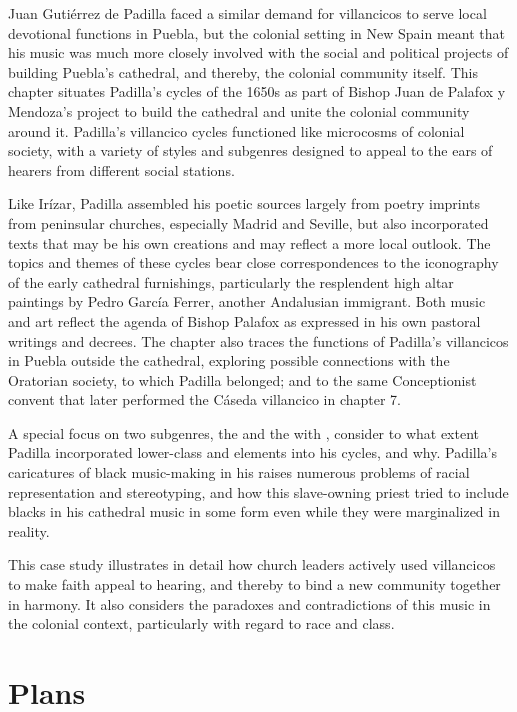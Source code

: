 \documentclass{vcbook-proposal}
\begin{document}
Juan Gutiérrez de Padilla faced a similar demand for villancicos to serve local devotional functions in Puebla, but the colonial setting in New Spain meant that his music was much more closely involved with the social and political projects of building Puebla's cathedral, and thereby, the colonial community itself.
This chapter situates Padilla's cycles of the 1650s as part of Bishop Juan de Palafox y Mendoza's project to build the cathedral and unite the colonial community around it.
Padilla's villancico cycles functioned like microcosms of colonial society, with a variety of styles and subgenres designed to appeal to the ears of hearers from different social stations.

Like Irízar, Padilla assembled his poetic sources largely from poetry imprints from peninsular churches, especially Madrid and Seville, but also incorporated texts that may be his own creations and may reflect a more local outlook.
The topics and themes of these cycles bear close correspondences to the iconography of the early cathedral furnishings, particularly the resplendent high altar paintings by Pedro García Ferrer, another Andalusian immigrant.
Both  music and art reflect the agenda of Bishop Palafox as expressed in his own pastoral writings and decrees.
The chapter also traces the functions of Padilla's villancicos in Puebla outside the cathedral, exploring possible connections with the Oratorian society, to which Padilla belonged; and to the same Conceptionist convent that later performed the Cáseda villancico in chapter 7.

A special focus on two subgenres, the  and the  with , consider to what extent Padilla incorporated lower-class and  elements into his cycles, and why.
Padilla's caricatures of black music-making in his  raises numerous problems of racial representation and stereotyping, and how this slave-owning priest tried to include blacks in his cathedral music in some form even while they were marginalized in reality.

This case study illustrates in detail how church leaders actively used villancicos to make faith appeal to hearing, and thereby to bind a new community together in harmony.
It also considers the paradoxes and contradictions of this music in the colonial context, particularly with regard to race and class.

\section{Plans}
\end{document}
